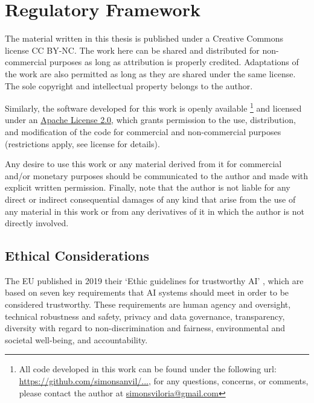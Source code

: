 \documentclass[../main.tex]{subfiles}
\begin{document}
\chapter*{Regulatory Framework} \label{chap:regulatory_framework}

The material written in this thesis is published under a Creative Commons license CC BY-NC. The work here can be shared and distributed for non-commercial purposes as long as attribution is properly credited. Adaptations of the work are also permitted as long as they are shared under the same license. The sole copyright and intellectual property belongs to the author. 

Similarly, the software developed for this work is openly available
\footnote{All code developed in this work can be found under the following url: \href{}{https://github.com/simonsanvil/...}, for any questions, concerns, or comments, please contact the author at \href{mailto:simonsviloria@gmail.com}{simonsviloria@gmail.com}
} 
and licensed under an \href{https://en.wikipedia.org/wiki/Apache_License}{Apache License 2.0}, which grants permission to the use, distribution, and modification of the code for commercial and non-commercial purposes (restrictions apply, see license for details). 

Any desire to use this work or any material derived from it for commercial and/or monetary purposes should be communicated to the author and made with explicit written permission. Finally, note that the author is not liable for any direct or indirect consequential damages of any kind that arise from the use of any material in this work or from any derivatives of it in which the author is not directly involved.


\section*{Ethical Considerations}  \label{ethics}

The EU published in 2019 their `Ethic guidelines for trustworthy AI' \cite{noauthor_ethics_2019}, which are based on seven key requirements that AI systems should meet in order to be considered trustworthy. These requirements are human agency and oversight, technical robustness and safety, privacy and data governance, transparency, diversity with regard to non-discrimination and fairness, environmental and societal well-being, and accountability. 
\end{document}
